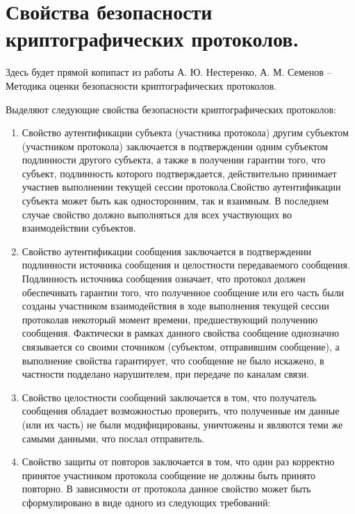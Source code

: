 \section{Свойства безопасности криптографических протоколов.} 

Здесь будет прямой копипаст из работы А. Ю. Нестеренко, А. М. Семенов -- Методика оценки безопасности криптографических протоколов.

Выделяют следующие свойства безопасности криптографических протоколов:

\begin{enumerate}
	\item Свойство аутентификации субъекта (участника протокола) другим субъектом (участником протокола) заключается в подтверждении одним субъектом подлинности другого субъекта, а также в получении гарантии того, что субъект, подлинность которого подтверждается, действительно принимает участиев выполнении текущей сессии протокола.Свойство аутентификации субъекта может быть как односторонним, так и взаимным. В последнем случае свойство должно выполняться для всех участвующих во взаимодействии субъектов.

	\item Свойство аутентификации сообщения заключается в подтверждении подлинности источника сообщения и целостности передаваемого сообщения. Подлинность источника сообщения означает, что протокол должен обеспечивать гарантии того, что полученное сообщение или его часть были созданы участником взаимодействия в ходе выполнения текущей сессии протоколав некоторый момент времени, предшествующий получению сообщения. Фактически в рамках данного свойства сообщение однозначно связывается со своими сточником (субъектом, отправившим сообщение), а выполнение свойства гарантирует, что сообщение не было искажено, в частности подделано нарушителем, при передаче по каналам связи.
	
	\item Свойство целостности сообщений заключается в том, что получатель сообщения обладает возможностью проверить, что полученные им данные (или их часть) не были модифицированы, уничтожены и являются теми же самыми данными, что послал отправитель. 
	
	\item Свойство защиты от повторов заключается в том, что один раз корректно принятое участником протокола сообщение не должны быть принято повторно. В зависимости от протокола данное свойство может быть сформулировано в виде одного из следующих требований:
	

\end{enumerate}
